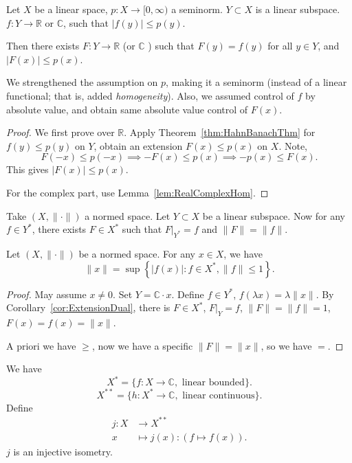 \begin{corollary}
	\label{cor:HahnBanachII}
	
	Let $X$ be a linear space, $p: X \to [0,\infty )$ a seminorm. $Y \subset X$ is a linear subspace. $f: Y \to  \mathbb{R}$ or $\mathbb{C}$, such that $|f(y)| \le  p(y)$.

	Then there exists $F: Y \to  \mathbb{R}$ (or $\mathbb{C}$ ) such that $F(y) = f(y)$ for all $y \in Y$, and $\left| F(x) \right| \le p(x)$.
\end{corollary}
\begin{remark}
	We strengthened the assumption on $p$, making it a seminorm (instead of a linear functional; that is, added \textit{homogeneity}). Also, we assumed control of $f$ by absolute value, and obtain same absolute value control of $F(x)$.
\end{remark}

\begin{proof}
	We first prove over $\mathbb{R}$. Apply Theorem~\ref{thm:HahnBanachThm} for $f(y) \le p(y)$ on $Y$, obtain an extension $F(x) \le  p(x)$ on $X$. Note, 
	\[
		F(- x) \le p(- x) \implies -F(x) \le p(x) \implies -p(x) \le F(x)
	.\] 
	This gives $|F(x)|\le p(x)$.
	
	For the complex part, use Lemma~\ref{lem:RealComplexHom}.
\end{proof}

\begin{corollary}
	\label{cor:ExtensionDual}
	Take $(X, \|\cdot \|)$ a normed space. Let $Y \subset X$ be a linear subspace. Now for any $f \in Y^*$, there exists $F \in X^*$ such that $F|_{Y^*} = f$ and $\|F\| = \|f\|$. 
\end{corollary}


\begin{corollary}
	\label{cor:NormFromDual}
	Let $(X, \|\cdot \|)$ be a normed space. For any $x \in X$, we have
	\[
		\|x\| = \sup \left\{|f(x)|: f \in X^*, \|f\| \le  1\right\} 
	.\] 
\end{corollary}
\begin{proof}
	May assume $x \neq 0$. Set $Y = \mathbb{C} \cdot x$. Define $f \in Y^*$, $f(\lambda x) = \lambda \|x\|$. By Corollary~\ref{cor:ExtensionDual}, there is $F \in X^*$, $F|_Y = f$, $\|F\| = \|f\| = 1$, $F(x) = f(x) = \|x\|$.

	A priori we have $\ge $, now we have a specific $\|F\| = \|x\|$, so we have  $=$.
\end{proof}

We have
\[
	X^* = \{f: X \to \mathbb{C}, \text{ linear bounded}\} 
.\] 
\[
	X^{**} = \{h: X^* \to \mathbb{C}, \text{ linear continuous}\} 
.\] 
Define
\begin{align*}
	j: X &\longrightarrow X^{* *} \\
	x &\longmapsto j(x) : \left( f \mapsto f(x) \right) 
.\end{align*}
$j$ is an injective isometry.



